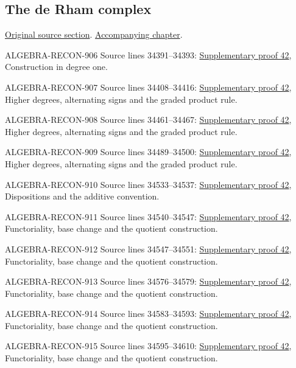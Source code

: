 \subsection{The de Rham complex}
\hypertarget{algebra-source-section-de-rham-complex}{}
\noindent\href{https://github.com/stacks/stacks-project/blob/a04446e57ec1fbc252a871afcec7752fb2807b14/algebra.tex\#L34387}{Original source section}. \href{algebra.pdf\#nameddest=section-de-rham-complex}{Accompanying chapter}.

\begin{AlgebraSourceRoutes}
\item[ALGEBRA-RECON-906] Source lines 34391--34393: \hyperlink{algebra_de_rham_notes_20260928}{Supplementary proof 42}, Construction in degree one.
\item[ALGEBRA-RECON-907] Source lines 34408--34416: \hyperlink{algebra_de_rham_notes_20260928}{Supplementary proof 42}, Higher degrees, alternating signs and the graded product rule.
\item[ALGEBRA-RECON-908] Source lines 34461--34467: \hyperlink{algebra_de_rham_notes_20260928}{Supplementary proof 42}, Higher degrees, alternating signs and the graded product rule.
\item[ALGEBRA-RECON-909] Source lines 34489--34500: \hyperlink{algebra_de_rham_notes_20260928}{Supplementary proof 42}, Higher degrees, alternating signs and the graded product rule.
\item[ALGEBRA-RECON-910] Source lines 34533--34537: \hyperlink{algebra_de_rham_notes_20260928}{Supplementary proof 42}, Dispositions and the additive convention.
\item[ALGEBRA-RECON-911] Source lines 34540--34547: \hyperlink{algebra_de_rham_notes_20260928}{Supplementary proof 42}, Functoriality, base change and the quotient construction.
\item[ALGEBRA-RECON-912] Source lines 34547--34551: \hyperlink{algebra_de_rham_notes_20260928}{Supplementary proof 42}, Functoriality, base change and the quotient construction.
\item[ALGEBRA-RECON-913] Source lines 34576--34579: \hyperlink{algebra_de_rham_notes_20260928}{Supplementary proof 42}, Functoriality, base change and the quotient construction.
\item[ALGEBRA-RECON-914] Source lines 34583--34593: \hyperlink{algebra_de_rham_notes_20260928}{Supplementary proof 42}, Functoriality, base change and the quotient construction.
\item[ALGEBRA-RECON-915] Source lines 34595--34610: \hyperlink{algebra_de_rham_notes_20260928}{Supplementary proof 42}, Functoriality, base change and the quotient construction.

\end{AlgebraSourceRoutes}
